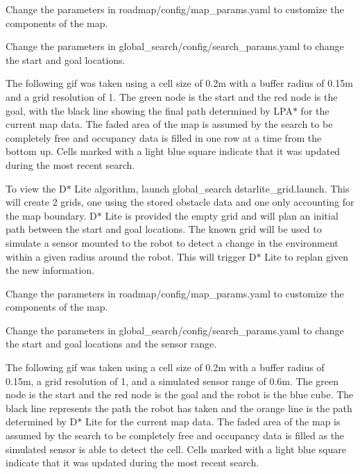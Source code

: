 \begin{DoxyItemize}
\item Change the parameters in {\ttfamily roadmap/config/map\+\_\+params.\+yaml} to customize the components of the map.
\item Change the parameters in {\ttfamily global\+\_\+search/config/search\+\_\+params.\+yaml} to change the start and goal locations.
\end{DoxyItemize}

The following gif was taken using a cell size of 0.\+2m with a buffer radius of 0.\+15m and a grid resolution of 1. The green node is the start and the red node is the goal, with the black line showing the final path determined by L\+P\+A$\ast$ for the current map data. The faded area of the map is assumed by the search to be completely free and occupancy data is filled in one row at a time from the bottom up. Cells marked with a light blue square indicate that it was updated during the most recent search.



To view the D$\ast$ Lite algorithm, launch {\ttfamily global\+\_\+search dstarlite\+\_\+grid.\+launch}. This will create 2 grids, one using the stored obstacle data and one only accounting for the map boundary. D$\ast$ Lite is provided the empty grid and will plan an initial path between the start and goal locations. The known grid will be used to simulate a sensor mounted to the robot to detect a change in the environment within a given radius around the robot. This will trigger D$\ast$ Lite to replan given the new information.


\begin{DoxyItemize}
\item Change the parameters in {\ttfamily roadmap/config/map\+\_\+params.\+yaml} to customize the components of the map.
\item Change the parameters in {\ttfamily global\+\_\+search/config/search\+\_\+params.\+yaml} to change the start and goal locations and the sensor range.
\end{DoxyItemize}

The following gif was taken using a cell size of 0.\+2m with a buffer radius of 0.\+15m, a grid resolution of 1, and a simulated sensor range of 0.\+6m. The green node is the start and the red node is the goal and the robot is the blue cube. The black line represents the path the robot has taken and the orange line is the path determined by D$\ast$ Lite for the current map data. The faded area of the map is assumed by the search to be completely free and occupancy data is filled as the simulated sensor is able to detect the cell. Cells marked with a light blue square indicate that it was updated during the most recent search.



